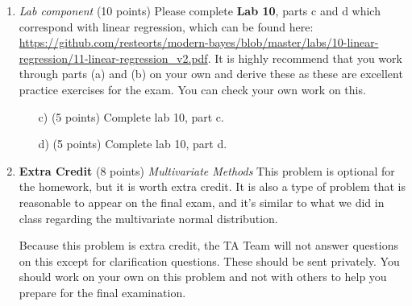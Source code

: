 \documentclass{article}
\begin{document}
\begin{enumerate}
\item \emph{Lab component} (10 points) Please complete \textbf{Lab 10}, parts c and d which correspond with linear regression, which can be found here: \url{https://github.com/resteorts/modern-bayes/blob/master/labs/10-linear-regression/11-linear-regression_v2.pdf}.
It is highly recommend that you work through parts (a) and (b) on your own and derive these as these are excellent practice exercises for the exam. You can check your own work on this. 
\begin{enumerate}
\item[c)] (5 points) Complete lab 10, part c.
\item[d)] (5 points) Complete lab 10, part d.
\end{enumerate}

\newpage

\item \textbf{Extra Credit} (8 points) \emph{Multivariate Methods} 
This problem is optional for the homework, but it is worth extra credit. It is also a type of problem that is reasonable to appear on the final exam, and it's similar to what we did in class regarding the multivariate normal distribution. 

Because this problem is extra credit, the TA Team will not answer questions on this except for clarification questions. These should be sent privately. You should work on your own on this problem and not with others to help you prepare for the final examination. 


\end{enumerate}
\end{document}
